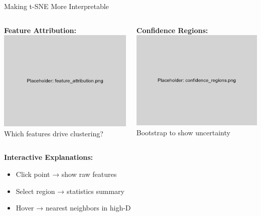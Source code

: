 \documentclass[aspectratio=169]{beamer}
\begin{document}
\begin{frame}{Making t-SNE More Interpretable}
\begin{columns}
\textbf{Feature Attribution:}
\includegraphics[width=\textwidth]{./Figures/feature_attribution.png}
Which features drive clustering?

\textbf{Confidence Regions:}
\includegraphics[width=\textwidth]{./Figures/confidence_regions.png}
Bootstrap to show uncertainty
\end{columns}

\vspace{0.3cm}
\textbf{Interactive Explanations:}
\begin{itemize}
\item Click point → show raw features
\item Select region → statistics summary
\item Hover → nearest neighbors in high-D
\end{itemize}
\end{frame}
\end{document}
